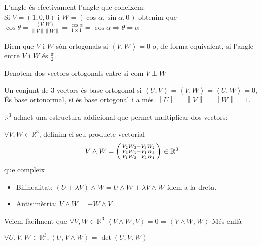 \documentclass[../main.tex]{subfiles}
\begin{document}
	L'angle és efectivament l'angle que coneixem.\\
	Si $V = (1,0,0)\text{ i }W = (\cos{\alpha}, \sin{\alpha}, 0)$ obtenim que $\cos{\theta} = \frac{\left\langle V, W\right\rangle}{\left\lVert V\right\rVert\left\lVert W\right\rVert } = \frac{\cos{\alpha}}{1\times1} = \cos{\alpha} \Rightarrow \theta = \alpha$
	\begin{definicio}
	    Diem que $V\text{ i }W$ són ortogonals si $\left\langle V, W\right\rangle = 0$ o, de forma
	    equivalent, si l'angle entre $V\text{ i }W$ és $\frac{\pi}{2}$.\\
	    \begin{notacio}
	        Denotem dos vectors ortogonals entre si com $V\perp W$
	    \end{notacio}
	    Un conjunt de 3 vectors és base ortogonal si $\left\langle U, V\right\rangle = \left\langle V, W\right\rangle = \left\langle U, W\right\rangle = 0$,
	    És base ortonormal, si és base ortogonal i a més $\left\lVert U\right\rVert = \left\lVert V\right\rVert = \left\lVert W\right\rVert = 1$.
	\end{definicio}
	$\mathbb{R}^3$ admet una estructura addicional que permet multiplicar dos vectors:
	\begin{definicio}
	    $\forall V, W \in \mathbb{R}^3$, definim el seu producte vectorial
	    \begin{displaymath}
	        V\wedge W = \begin{psmallmatrix}
	        V_2W_3-V_3W_2\\
	        V_3W_1-V_1W_3\\
	        V_1W_2-V_2W_1
	        \end{psmallmatrix} \in \mathbb{R}^3
	    \end{displaymath}
	    que compleix
	    \begin{itemize}
	        \item Bilinealitat: $(U + \lambda V) \wedge W = U\wedge W + \lambda V\wedge W$ ídem a la
	        dreta.
	        \item Antisimètria: $V\wedge W = -W \wedge V$
	    \end{itemize}
	\end{definicio}
	Veiem fàcilment que $\forall V, W \in \mathbb{R}^3$ $\left\langle V\wedge W, V\right\rangle = 0 = \left\langle V\wedge W, W\right\rangle$
	Més enllà
	\begin{proposition}
	    $\forall U, V, W \in \mathbb{R}^3, \left\langle U, V\wedge W\right\rangle = \det{\left(U, V, W\right)}$
	\end{proposition}
\end{document}
